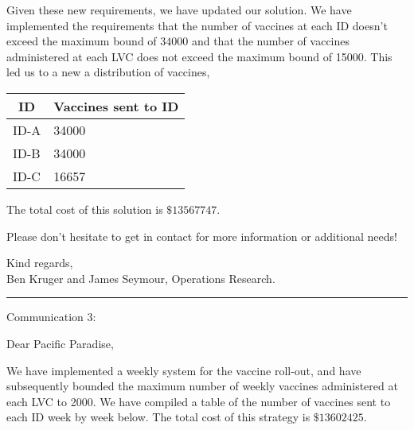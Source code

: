 \documentclass[12pt]{article}
\begin{document}
{    Given these new requirements, we have updated our solution. 
    We have implemented the requirements that the number of vaccines at each ID doesn't exceed the maximum bound of \(34000\) and that the number of vaccines administered at each LVC does not exceed the maximum bound of 15000. This led us to a new a distribution of vaccines, 
    \begin{center}
        \begin{table}[h]
            \begin{tabular}{|l|l|}
            \hline
            \multicolumn{1}{|c|}{\textbf{ID}} & \multicolumn{1}{c|}{\textbf{Vaccines sent to   ID}} \\ \hline
            ID-A                              & 34000                                               \\ \hline
            ID-B                              & 34000                                               \\ \hline
            ID-C                              & 16657                                               \\ \hline
            \end{tabular}
            \end{table}
    \end{center}
    The total cost of this solution is \(\$13567747\).

    Please don't hesitate to get in contact for more information or additional needs!
    
    Kind regards,\\
    Ben Kruger and James Seymour, Operations Research.\\
    \hrule
    
    Communication 3:
    
    Dear Pacific Paradise,
    
    We have implemented a weekly system for the vaccine roll-out, and have subsequently bounded the maximum number of weekly vaccines administered at each LVC to 2000. We have compiled a table of the number of vaccines sent to each ID week by week below. The total cost of this strategy is \(\$13602425\). 

}
\end{document}
